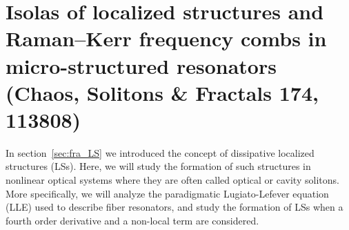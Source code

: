 \chapter{Isolas of localized structures and Raman–Kerr frequency combs in micro-structured resonators (Chaos, Solitons \& Fractals 174, 113808)}

In section~\ref{sec:fra_LS} we introduced the concept of dissipative localized structures (LSs). Here, we will study the formation
of such structures in nonlinear optical systems where they are often called optical or cavity solitons. 
More specifically, we will analyze the paradigmatic Lugiato-Lefever equation (LLE) \cite{lugiatolefever1987} used to describe fiber resonators, and
study the formation of LSs when a fourth order derivative and a non-local term are considered.